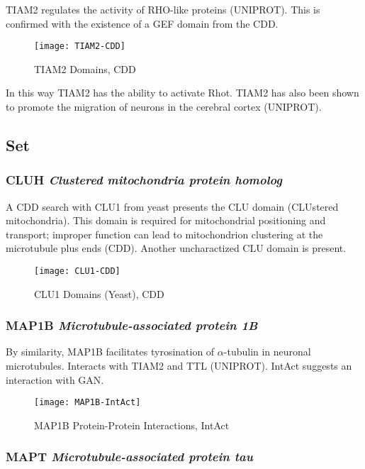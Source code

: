 TIAM2 regulates the activity of RHO-like proteins (UNIPROT). This is confirmed
with the existence of a GEF domain from the CDD.

\begin{figure}[h!]
  \texttt{[image: TIAM2-CDD]}
  \caption{TIAM2 Domains, CDD}
\end{figure}



In this way TIAM2 has the ability to activate Rhot. TIAM2 has also been shown to
promote the migration of neurons in the cerebral cortex (UNIPROT).

\subsection{Set}

\subsubsection{CLUH \textit{Clustered mitochondria protein homolog}}

A CDD search with CLU1 from yeast presents the CLU domain (CLUstered
mitochondria). This domain is required for mitochondrial positioning and
transport; improper function can lead to mitochondrion clustering at the
microtubule plus ends (CDD). Another uncharactized CLU domain is present.

\begin{figure}[h!]
  \texttt{[image: CLU1-CDD]}
  \caption{CLU1 Domains (Yeast), CDD}
\end{figure}

\subsubsection{MAP1B \textit{Microtubule-associated protein 1B}}

By similarity, MAP1B facilitates tyrosination of $\alpha$-tubulin in
neuronal microtubules. Interacts with TIAM2 and TTL (UNIPROT). IntAct
suggests an interaction with GAN.

\begin{figure}[h!]
  \centering
    \texttt{[image: MAP1B-IntAct]}
  \caption{MAP1B Protein-Protein Interactions, IntAct}
\end{figure}

\subsubsection{MAPT \textit{Microtubule-associated protein tau}}

